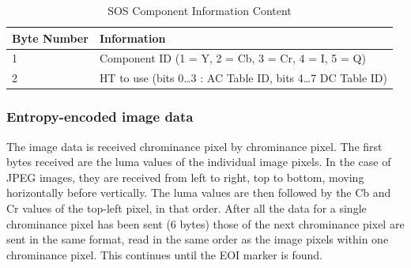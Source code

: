 \begin{table}[!hbtp]
	\caption{SOS Component Information Content}
	\centering
	\begin{tabular}{ | p{2cm} | p{4cm} | }
	\hline
	\textbf{Byte Number} &  \textbf{Information} \\ \hline
	1 & Component ID (1 = Y, 2 = Cb, 3 = Cr, 4 = I, 5 = Q)\\ \hline
	2 & HT to use (bits 0\ldots3 : AC Table ID, bits 4\ldots7 DC Table ID)\\ \hline
	\end{tabular}
\end{table}

\subsubsection{Entropy-encoded image data}
\label{sec:entropycrho}

The image data is received chrominance pixel by chrominance pixel. 
The first bytes received are the luma values of the individual image pixels. 
In the case of JPEG images, they are received from left to right, top to bottom, moving horizontally before vertically. 
The luma values are then followed by the Cb and Cr values of the top-left pixel, in that order. 
After all the data for a single chrominance pixel has been sent (6 bytes) those of the next chrominance pixel are sent in the same format, 
read in the same order as the image pixels within one chrominance pixel. This continues until the EOI marker is found.
